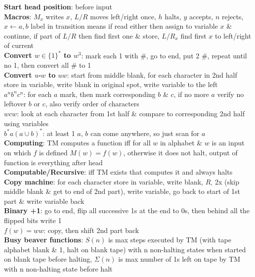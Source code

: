 \documentclass[a4paper]{article}
\begin{document}
\begin{multicols}{2}
        \textbf{Start head position}: before input\\
        \textbf{Macros}: $M_x$ writes $x$, $L/R$ moves left/right once, $h$ halts, $y$ accepts, $n$ rejects, $x \leftarrow a,b$ label in transition means if read either then assign to variable $x$ \& continue, if part of $L/R$ then find first one \& store, $L/R_x$ find first $x$ to left/right of current\\
        \boldmath\textbf{Convert $w \in {\{1\}}^*$ to $w^3$}\unboldmath: mark each 1 with \#, go to end, put 2 \#, repeat until no 1, then convert all \# to 1\\
        \boldmath\textbf{Convert $u \square w$ to $uw$\unboldmath}: start from middle blank, for each character in 2nd half store in variable, write blank in original spot, write variable to the left\\
        \boldmath$a^n b^n c^n$\unboldmath: for each $a$ mark, then mark corresponding $b$ \& $c$, if no more $a$ verify no leftover $b$ or $c$, also verify order of characters\\
        \boldmath$wcw$\unboldmath: look at each character from 1st half \& compare to corresponding 2nd half using variables\\
        \boldmath$b^* a{(a \cup b)}^*$\unboldmath: at least 1 $a$, $b$ can come anywhere, so just scan for $a$\\
        \textbf{Computing}: TM computes a function iff for all $w$ in alphabet \& $w$ is an input on which $f$ is defined $M(w) = f(w)$, otherwise it does not halt, output of function is everything after head\\
        \textbf{Computable/Recursive}: iff TM exists that computes it and always halts\\
        \textbf{Copy machine}: for each character store in variable, write blank, $R_\square$ 2x (skip middle blank \& get to end of 2nd part), write variable, go back to start of 1st part \& write variable back\\
        \textbf{Binary +1}: go to end, flip all successive 1s at the end to 0s, then behind all the flipped bits write 1\\
        \boldmath$f(w) = ww$\unboldmath: copy, then shift 2nd part back\\
        \textbf{Busy beaver functions}: $S(n)$ is max steps executed by TM (with tape alphabet blank \& 1, halt on blank tape) with n non-halting states when started on blank tape before halting, $\Sigma(n)$ is max number of 1s left on tape by TM with n non-halting state before halt\\

\end{multicols}
\end{document}
